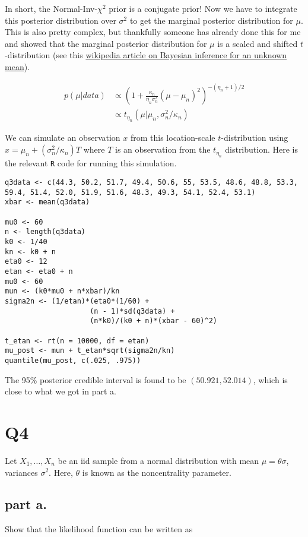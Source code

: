 \documentclass[12pt,a4paper]{article}
\begin{document}
In short, the Normal-Inv-$\chi^2$ prior is a conjugate prior!
Now we have to integrate this posterior distribution over $\sigma^2$ to get the marginal posterior distribution for $\mu$.
This is also pretty complex, but thankfully someone has already done this for me and showed that the marginal posterior distribution for $\mu$ is a scaled and shifted $t$-distribution (see this \href{https://en.wikipedia.org/wiki/Student%27s_t-distribution#In_Bayesian_statistics}{wikipedia article on Bayesian inference for an unknown mean}).

\begin{align*}
	p(\mu | data) &\propto \left(1 + \frac{\kappa_n}{\eta_n \sigma^2_n} (\mu - \mu_n)^2\right)^{-(\eta_n + 1)/2} \\
	&\propto t_{\eta_n}(\mu | \mu_n, \sigma^2_n / \kappa_n)
\end{align*}

We can simulate an observation $x$ from this location-scale $t$-distribution using $x = \mu_n + (\sigma^2_n / \kappa_n)T$ where $T$ is an observation from the $t_{\eta_n}$ distribution.
Here is the relevant \texttt{R} code for running this simulation.

\begin{lstlisting}
q3data <- c(44.3, 50.2, 51.7, 49.4, 50.6, 55, 53.5, 48.6, 48.8, 53.3, 59.4, 51.4, 52.0, 51.9, 51.6, 48.3, 49.3, 54.1, 52.4, 53.1)
xbar <- mean(q3data)

mu0 <- 60
n <- length(q3data)
k0 <- 1/40
kn <- k0 + n
eta0 <- 12
etan <- eta0 + n
mu0 <- 60
mun <- (k0*mu0 + n*xbar)/kn
sigma2n <- (1/etan)*(eta0*(1/60) +
					(n - 1)*sd(q3data) +
					(n*k0)/(k0 + n)*(xbar - 60)^2)

t_etan <- rt(n = 10000, df = etan)
mu_post <- mun + t_etan*sqrt(sigma2n/kn)
quantile(mu_post, c(.025, .975))
\end{lstlisting}

The 95\% posterior credible interval is found to be $(50.921, 52.014)$, which is close to what we got in part a.

\section{Q4}
Let $X_1, \ldots ,X_n $ be an iid sample from a normal distribution with mean $\mu = \theta\sigma$, variances $\sigma^2$.
Here, $\theta$ is known as the noncentrality parameter.

\subsection{part a.}
Show that the likelihood function can be written as
\end{document}
